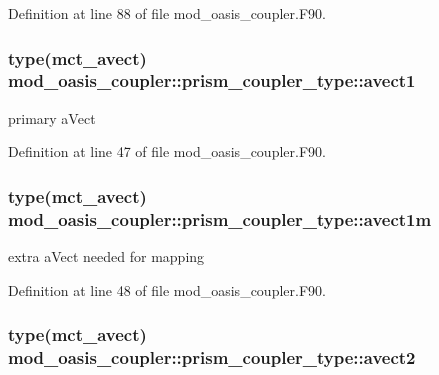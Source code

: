 Definition at line 88 of file mod\+\_\+oasis\+\_\+coupler.\+F90.

\hypertarget{structmod__oasis__coupler_1_1prism__coupler__type_a153e0bf9e28c0a8ff4d8bb27c83f598e}{
\subsubsection[{avect1}]{\setlength{\rightskip}{0pt plus 5cm}type(mct\+\_\+avect) mod\+\_\+oasis\+\_\+coupler\+::prism\+\_\+coupler\+\_\+type\+::avect1\hspace{0.3cm}{\ttfamily [private]}}}\label{structmod__oasis__coupler_1_1prism__coupler__type_a153e0bf9e28c0a8ff4d8bb27c83f598e}


primary a\+Vect 



Definition at line 47 of file mod\+\_\+oasis\+\_\+coupler.\+F90.

\hypertarget{structmod__oasis__coupler_1_1prism__coupler__type_ab5626722caee601622658134916f12bf}{
\subsubsection[{avect1m}]{\setlength{\rightskip}{0pt plus 5cm}type(mct\+\_\+avect) mod\+\_\+oasis\+\_\+coupler\+::prism\+\_\+coupler\+\_\+type\+::avect1m\hspace{0.3cm}{\ttfamily [private]}}}\label{structmod__oasis__coupler_1_1prism__coupler__type_ab5626722caee601622658134916f12bf}


extra a\+Vect needed for mapping 



Definition at line 48 of file mod\+\_\+oasis\+\_\+coupler.\+F90.

\hypertarget{structmod__oasis__coupler_1_1prism__coupler__type_a7cd1aa8e520cf036f4dd72ad2445b774}{
\subsubsection[{avect2}]{\setlength{\rightskip}{0pt plus 5cm}type(mct\+\_\+avect) mod\+\_\+oasis\+\_\+coupler\+::prism\+\_\+coupler\+\_\+type\+::avect2\hspace{0.3cm}{\ttfamily [private]}}}\label{structmod__oasis__coupler_1_1prism__coupler__type_a7cd1aa8e520cf036f4dd72ad2445b774}


